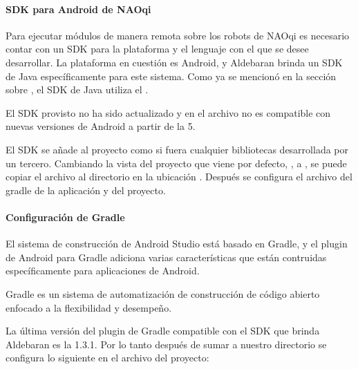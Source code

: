 \paragraph{SDK para Android de NAOqi}
\label{\detokenize{dev_docs:sdk-para-android-de-naoqi}}
Para ejecutar módulos de manera remota sobre los robots de NAOqi es necesario
contar con un SDK para la plataforma y el lenguaje con el que se desee
desarrollar. La plataforma en cuestión es Android, y Aldebaran brinda un SDK
de Java específicamente para este sistema. Como ya se mencionó en la sección
sobre , el SDK de Java utiliza el .

El SDK provisto  no ha sido actualizado y en el archivo  no es compatible
con nuevas versiones de Android a partir de la 5.

El SDK se añade al proyecto como si fuera cualquier bibliotecas desarrollada
por un tercero. Cambiando la vista del proyecto que viene por defecto, ,
a , se puede copiar el archivo 
al directorio en la ubicación . Después se configura el archivo
del gradle de la aplicación y del proyecto.


\paragraph{Configuración de Gradle}
\label{\detokenize{dev_docs:configuracion-de-gradle}}
El sistema de construcción de Android Studio está basado en Gradle, y el plugin
de Android para Gradle adiciona varias características que están
contruidas específicamente para aplicaciones de Android.\\

\begin{remark}
Gradle es un sistema de automatización de construcción de código abierto
enfocado a la flexibilidad y desempeño.
\end{remark}

La última versión del plugin de Gradle compatible con el SDK que brinda
Aldebaran es la 1.3.1. Por lo tanto después de sumar a nuestro directorio
 se configura lo siguiente en el archivo  del
proyecto:

%
\begin{sphinxVerbatim}[commandchars=\\\{\}]
 
   
     
\end{sphinxVerbatim}

